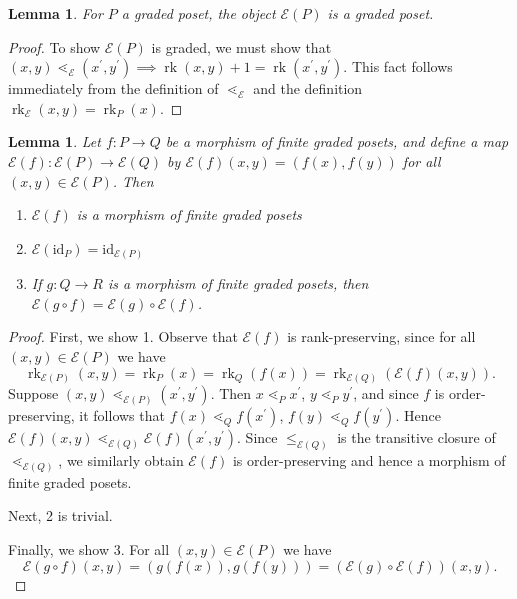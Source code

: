 \documentclass[smallextended, envcountsame, numbook]{svjour3}
\theoremstyle{plain}
\newtheorem{lem}[thm]{Lemma}
\theoremstyle{definition}
\theoremstyle{remark}
\numberwithin{equation}{section}
\newcommand{\id}{\mathrm{id}}
\newcommand\rk{\operatorname{rk}}
\begin{document}
\begin{lem}\label{lem:FP_graded_poset}
For $P$ a graded poset, the object $\mathcal E(P)$ is a graded poset.
\end{lem}

\begin{proof}
To show $\mathcal E(P)$ is graded, we must show that $(x, y) \lessdot_{\mathcal E} (x^\prime, y^\prime) \implies \rk(x, y)+1 = \rk(x^\prime , y^\prime)$.  This fact follows immediately from the definition of $\lessdot_{\mathcal E}$ and the definition $\rk_{\mathcal E}(x, y) = \rk_P(x)$.
\end{proof}

\begin{lem}\label{lem:Ff_poset_morphism}
Let $f\colon P\rightarrow Q$ be a morphism of finite graded posets, and define a map $\mathcal E(f)\colon \mathcal E(P)\rightarrow \mathcal E(Q)$ by $\mathcal{E}(f)(x,y) = (f(x),f(y))$ for all $(x,y)\in \mathcal{E}(P)$.  Then

\begin{enumerate}
\item $\mathcal{E}(f)$ is a morphism of finite graded posets
\item $\mathcal{E}(\id_P) = \id_{\mathcal{E}(P)}$
\item If $g\colon Q\rightarrow R$ is a morphism of finite graded posets, then $\mathcal E(g\circ f) = \mathcal E(g)\circ\mathcal E(f)$.
\end{enumerate}
\end{lem}

\begin{proof}
First, we show 1.
Observe that $\mathcal E(f)$ is rank-preserving, since for all $(x, y)\in \mathcal E(P)$ we have 
$$\rk_{\mathcal E(P)}(x, y) = \rk_P(x) = \rk_Q(f(x)) = \rk_{\mathcal E(Q)}(\mathcal E(f)(x, y)).$$
Suppose $(x, y)\lessdot_{\mathcal E(P)} (x^\prime, y^\prime)$.  Then $x\lessdot_P x^\prime$, $y\lessdot_P y^\prime$, and since $f$ is order-preserving, it follows that $f(x)\lessdot_Q f(x^\prime)$, $f(y)\lessdot_Q f(y^\prime)$. Hence $\mathcal E(f)(x,y) \lessdot_{\mathcal E(Q)} \mathcal E(f)(x^\prime , y^\prime)$. Since $\le_{\mathcal E(Q)}$ is the transitive closure of $\lessdot_{\mathcal E(Q)}$, we similarly obtain $\mathcal E(f)$ is order-preserving and hence a morphism of finite graded posets.

Next, 2 is trivial.

Finally, we show 3. For all $(x, y)\in \mathcal E(P)$ we have 
$$\mathcal E(g\circ f)(x, y) = (g(f(x)), g(f(y))) = \left(\mathcal E(g)\circ\mathcal E(f)\right)(x, y).$$
\end{proof}
\end{document}
